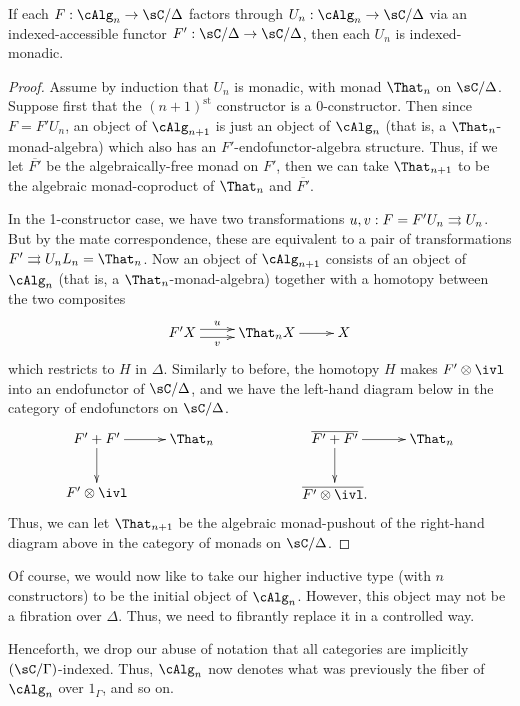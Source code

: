 \documentclass{amsart}
\begin{document}
\begin{lem}\label{thm:indargmonadic}
  If each $F:\cAlg_n \to \sC/\Delta$ factors through $U_n:\cAlg_n \to \sC/\Delta$ via an indexed-accessible functor $F':\sC/\Delta \to \sC/\Delta$, then each $U_n$ is indexed-monadic.
\end{lem}
\begin{proof}
  Assume by induction that $U_n$ is monadic, with monad $\That_n$ on $\sC/\Delta$.
  Suppose first that the $(n+1)^{\mathrm{st}}$ constructor is a 0-constructor.
  Then since $F = F' U_n$, an object of $\cAlg_{n+1}$ is just an object of $\cAlg_n$ (that is, a $\That_n$-monad-algebra) which also has an $F'$-endofunctor-algebra structure.
  Thus, if we let $\overline{F'}$ be the algebraically-free monad on $F'$, then we can take $\That_{n+1}$ to be the algebraic monad-coproduct of $\That_n$ and $\overline{F'}$.

  In the 1-constructor case, we have two transformations $u,v: F = F' U_n \rightrightarrows U_n$.
  But by the mate correspondence, these are equivalent to a pair of transformations $F' \toto U_n L_n = \That_n$.
  Now an object of $\cAlg_{n+1}$ consists of an object of $\cAlg_n$ (that is, a $\That_n$-monad-algebra) together with a homotopy between the two composites
  \[ \xymatrix{ F' X  \ar@<1mm>[r]^-{u} \ar@<-1mm>[r]_-{v} & \That_n X \ar[r] & X }\]
  which restricts to $H$ in $\Delta$.
  Similarly to before, the homotopy $H$ makes $F'\otimes\ivl$ into an endofunctor of $\sC/\Delta$, and we have the left-hand diagram below in the category of endofunctors on $\sC/\Delta$.
  \begin{equation}
  \vcenter{\xymatrix{
      F' + F'\ar[r]\ar[d] &
      \That_n\\
      F'\otimes\ivl
    }}
  \hspace{2cm}
  \vcenter{\xymatrix{
      \overline{F' + F'}\ar[r]\ar[d] &
      \That_n\\
      \overline{F'\otimes\ivl}.
      }}
  \end{equation}
  Thus, we can let $\That_{n+1}$ be the algebraic monad-pushout of the right-hand diagram above in the category of monads on $\sC/\Delta$.
\end{proof}

Of course, we would now like to take our higher inductive type (with $n$ constructors) to be the initial object of $\cAlg_n$.
However, this object may not be a fibration over $\Delta$.
Thus, we need to fibrantly replace it in a controlled way.

Henceforth, we drop our abuse of notation that all categories are implicitly $(\sC/\Gamma)$-indexed.
Thus, $\cAlg_n$ now denotes what was previously the fiber of $\cAlg_n$ over $1_\Gamma$, and so on.
\end{document}
